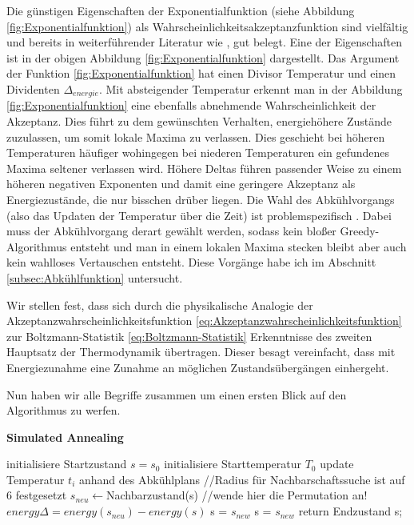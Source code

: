 Die günstigen Eigenschaften der Exponentialfunktion (siehe Abbildung \ref{fig:Exponentialfunktion}) als Wahrscheinlichkeitsakzeptanzfunktion sind vielfältig und bereits in weiterführender Literatur wie 
\cite{Kirkpatrick671},\cite{van1987simulated} gut belegt. Eine der Eigenschaften ist in der obigen Abbildung \ref{fig:Exponentialfunktion} dargestellt. Das Argument der Funktion 
\ref{fig:Exponentialfunktion} hat einen Divisor Temperatur und einen Dividenten $\Delta_{energie}$. Mit absteigender Temperatur erkennt man 
in der Abbildung \ref{fig:Exponentialfunktion} eine ebenfalls abnehmende Wahrscheinlichkeit der Akzeptanz. Dies führt zu dem gewünschten Verhalten, energiehöhere Zustände 
zuzulassen, um somit lokale Maxima zu verlassen. Dies geschieht bei höheren Temperaturen häufiger wohingegen bei niederen Temperaturen ein gefundenes Maxima
seltener verlassen wird. Höhere Deltas führen passender Weise zu einem höheren negativen Exponenten und damit eine geringere Akzeptanz als Energiezustände, die nur bisschen 
drüber liegen. Die Wahl des Abkühlvorgangs (also das Updaten der Temperatur über die Zeit) ist problemspezifisch \cite[S. 9]{Kirkpatrick671}. Dabei muss der Abkühlvorgang derart
gewählt werden, sodass kein bloßer Greedy-Algorithmus entsteht und man in einem lokalen Maxima stecken bleibt aber auch kein wahlloses Vertauschen entsteht.
Diese Vorgänge habe ich im Abschnitt \ref{subsec:Abkühlfunktion} untersucht.\par
Wir stellen fest, dass sich durch die physikalische Analogie der Akzeptanzwahrscheinlichkeitsfunktion \ref{eq:Akzeptanzwahrscheinlichkeitsfunktion} zur 
Boltzmann-Statistik \ref{eq:Boltzmann-Statistik} Erkenntnisse des zweiten Hauptsatz der Thermodynamik übertragen. Dieser besagt vereinfacht, 
dass mit Energiezunahme eine Zunahme an möglichen Zustandsübergängen einhergeht.

Nun haben wir alle Begriffe zusammen um einen ersten Blick auf den Algorithmus zu werfen.
\begin{tcolorbox}
\begin{algorithm}[H]
    \caption{\textbf{Simulated Annealing}}
    \begin{algorithmic}[1]
        \State initialisiere Startzustand $s=s_{0}$
        \State initialisiere Starttemperatur $T_0$
        \State update Temperatur $t_i$ anhand des Abkühlplans
        \State //Radius für Nachbarschaftssuche ist auf 6 festgesetzt
        \State $s_{neu}\leftarrow$Nachbarzustand(s) //wende hier die Permutation an!
        \State $energy\Delta = energy(s_{neu}) - energy(s)$
        \State s = $s_{new}$
        \Else{}
        \State s = $s_{new}$
        \EndIf
        \EndIf
        \EndFor
        \State return Endzustand s;
    \end{algorithmic}
    \label{alg:retargeting}
\end{algorithm}
\end{tcolorbox}

